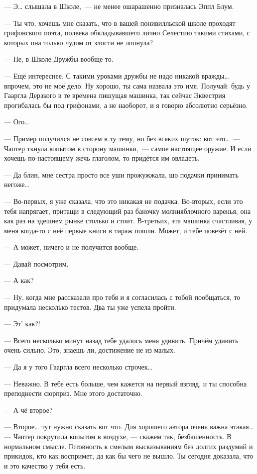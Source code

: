 \documentclass[fontsize=11pt,a5paper,titlepage=firstcover]{scrbook}
\begin{document}
--- Э{\ldots} слышала в Школе,~--- не менее ошарашенно призналась Эппл Блум.

--- Ты что, хочешь мне сказать, что в вашей понивилльской школе проходят грифонского поэта, полвека обкладывавшего лично Селестию такими стихами, с которых она только чудом от злости не лопнула?

--- Не, в Школе Дружбы вообще-то.

--- Ещё интереснее. С такими уроками дружбы не надо никакой вражды{\ldots} впрочем, это не моё дело. Ну хорошо, ты сама назвала это имя. Получай: будь у Гааргла Дерзкого в те времена пишущая машинка, так сейчас Эквестрия прогибалась бы под грифонами, а не наоборот, и я говорю абсолютно серьёзно.

--- Ого{\ldots}

--- Пример получился не совсем в ту тему, но без всяких шуток: вот это{\ldots}~--- Чаптер ткнула копытом в сторону машинки,~--- самое настоящее оружие. И если хочешь по-настоящему жечь глаголом, то придётся им овладеть.

--- Да блин, мне сестра просто все уши прожужжала, шо подачки принимать негоже{\ldots}

--- Во-первых, я уже сказала, что это никакая не подачка. Во-вторых, если это тебя напрягает, притащи в следующий раз баночку молнияблочного варенья, она как раз на здешнем рынке столько и стоит. В-третьих, эта машинка счастливая, у меня когда-то с неё первые книги в тираж пошли. Может, и тебе повезёт с ней.

--- А может, ничего и не получится вообще.

--- Давай посмотрим.

--- А как?

--- Ну, когда мне рассказали про тебя и я согласилась с тобой пообщаться, то придумала несколько тестов. Два ты уже успела пройти.

--- Эт’ как?!

--- Всего несколько минут назад тебе удалось меня удивить. Причём удивить очень сильно. Это, знаешь ли, достижение не из малых.

--- Да я у того Гааргла всего несколько строчек{\ldots}

--- Неважно. В тебе есть больше, чем кажется на первый взгляд, и ты способна преподнести сюрприз. Мне этого достаточно.

--- А чё второе?

--- Второе{\ldots} тут нужно сказать вот что. Для хорошего автора очень важна этакая{\ldots} --- Чаптер покрутила копытом в воздухе, --- скажем так, безбашенность. В нормальном смысле. Готовность к смелым высказываниям без долгих раздумий и прикидок, кто как воспримет, да как бы чего не вышло. Ты сегодня доказала, что и это качество у тебя есть.
\end{document}
